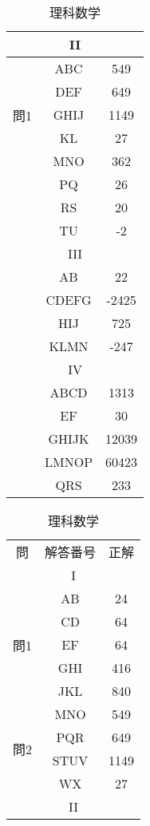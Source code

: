 \documentclass{jsarticle}
\begin{document}
\begin{CJK}{UTF8}{min}
\begin{table}[htbp]
\begin{minipage}[t]{0.48\textwidth}
\begin{tabular}{|c|c|c|}
\hline
\multicolumn{3}{|c|}{II} \\
\hline
\multirow{5}{*}{問1} 
 & \textsf{ABC} & 549 \\
 & \textsf{DEF} & 649\\
 & \textsf{GHIJ} & 1149 \\
 & \textsf{KL} & 27 \\
\hline
\multirow{5}{*}{問2}
 & \textsf{MNO} & 362 \\
 & \textsf{PQ} & 26 \\
 & \textsf{RS} & 20\\
 & \textsf{TU} & -2 \\
\hline
\multicolumn{3}{|c|}{III} \\
\hline
 & \textsf{AB} & 22 \\
 & \textsf{CDEFG} & -2425 \\
 & \textsf{HIJ} & 725 \\
 & \textsf{KLMN} & -247 \\
\hline
\multicolumn{3}{|c|}{IV} \\
\hline
 & \textsf{ABCD} & 1313 \\
 & \textsf{EF} & 30 \\
 & \textsf{GHIJK} & 12039 \\
 & \textsf{LMNOP} & 60423\\
 & \textsf{QRS} & 233 \\
\hline
\end{tabular}
\end{minipage}
\hfill
\begin{minipage}[t]{0.48\textwidth}
\centering
\caption*{理科数学}
\begin{tabular}{|c|c|c|}
\hline
\multirow{2}{*}{問} & \multirow{2}{*}{解答番号} & \multirow{2}{*}{正解} \\
 &  & \\
\hline
\multicolumn{3}{|c|}{I} \\
\hline
\multirow{5}{*}{問1} 
 & \textsf{AB} & 24 \\
 & \textsf{CD} & 64 \\
 & \textsf{EF} & 64 \\
 & \textsf{GHI} & 416 \\
 & \textsf{JKL} & 840 \\
\hline
\multirow{4}{*}{問2} 
 & \textsf{MNO} & 549 \\
 & \textsf{PQR} & 649 \\
 & \textsf{STUV} & 1149\\
 & \textsf{WX} & 27 \\
\hline
\multicolumn{3}{|c|}{II} \\

\end{tabular}
\end{minipage}
\end{table}
\end{CJK}
\end{document}
